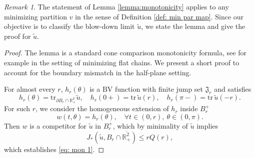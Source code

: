 \documentclass[leqno,11pt]{amsart}
\let\pa=\partial
\let\pa=\partial
\theoremstyle{remark}
\newtheorem{rmk}{Remark}[section]
\newcommand{\BR}{\mathbb{R}}
\newcommand{\tu}{\tilde{u}}
\begin{document}
\begin{rmk}
    The statement of Lemma \ref{lemma:monotonicity} applies to any minimizing partition $v$ in the sense of Definition \ref{def: min par map}. Since our objective is to classify the blow-down limit $\tu$, we state the lemma and give the proof for $\tu$.  
\end{rmk}

\begin{proof}
    The lemma is a standard cone comparison monotonicity formula, see for example \cite[Theorem 8.2]{whitenotes} in the setting of minimizing flat chains. We present a short proof to account for the boundary mismatch in the half-plane setting.

    For almost every $r$, $h_r(\theta)$ is a $\mathrm{BV}$ function with finite jump set $\mathfrak{J}_r$ and satisfies
    \begin{equation}\label{good r}
        h_r(\theta)=\mathrm{tr}_{\pa B_r\cap\BR_+^2} \tilde{u},\quad h_r(0+)=\mathrm{tr}\, \tilde{u}(r),\quad h_r(\pi-)=\mathrm{tr}\, \tilde{u}(-r).
    \end{equation}
For such $r$, we consider the homogeneous extension of $h_r$ inside $B_r^+$
    \begin{equation*}
        w(t,\theta)=h_r(\theta),\quad \forall t\in(0,r),\ \theta\in(0,\pi).
    \end{equation*}
    Then $w$ is a competitor for $\tilde{u}$ in $B_r^+$, which by minimality of $\tu$ implies 
    \begin{equation*}
        J_*(\tu,B_r\cap \overline{\BR_+^2})\leq rQ(r),
    \end{equation*}
    which establishes \eqref{eq: mon 1}.


\end{proof}
\end{document}
